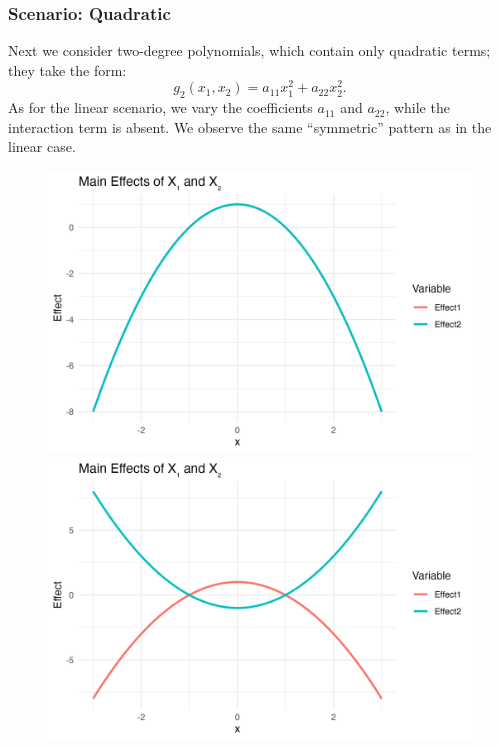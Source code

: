 \subsubsection*{Scenario: Quadratic}
Next we consider two-degree polynomials, which contain only quadratic terms; they take the form: $$g_2(x_1, x_2) = a_{11} x_1^2 + a_{22} x_2^2.$$
As for the linear scenario, we vary the coefficients $a_{11}$ and $a_{22}$, while the interaction term is absent. We observe the same ``symmetric'' pattern as in the linear case.
\begin{figure}[htpb]
    \centering
    \begin{minipage}[t]{0.49\textwidth}
        \centering
        \includegraphics[width=\textwidth]{images/quadratic_a1p00_a2p00_a11m10_a22m10_a12p00_rhop00_main.png}
    \end{minipage}%
    \hfill
    \begin{minipage}[t]{0.49\textwidth}
        \centering
        \includegraphics[width=\textwidth]{images/quadratic_a1p00_a2p00_a11m10_a22p10_a12p00_rhop00_main.png}

\end{minipage}
\end{figure}
